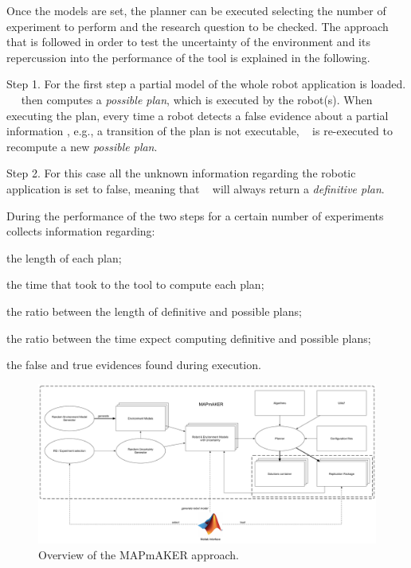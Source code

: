 Once the models are set, the planner can be executed selecting the number of experiment to perform and the research question to be checked.
The approach that is followed in order to test the uncertainty of the environment and its repercussion into the performance of the tool is explained in the following.

Step 1. For the first step a partial model of the whole robot application is loaded. 
~\toolName~ then computes a \emph{possible plan}, which is executed by the robot(s).
When executing the plan, every time a robot detects a false evidence about a partial information , e.g., a transition of the plan is not executable, \toolName~ is re-executed to recompute a new \emph{possible plan}.

Step 2. For this case all the unknown information regarding the robotic application is set to false, meaning that \toolName~ will always return a \emph{definitive plan}.

During the performance of the two steps for a certain number of experiments \toolName~ collects information regarding:
\begin{enumerate*}
\item the length of each plan;
\item the time that took to the tool to compute each plan;
\item the ratio between the length of definitive and possible plans;
\item the ratio between the time expect computing definitive and possible plans;
\item the false and true evidences found during execution.
\end{enumerate*}

\begin{figure}[!t]
\begin{center}
\includegraphics[width=1\linewidth]{Figures/MAPmAKER.pdf}
\caption{Overview of the MAPmAKER approach.}
\label{fig:overview}
\end{center}
\end{figure}





